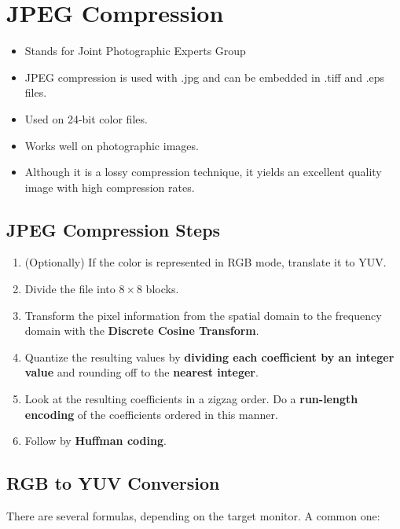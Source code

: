 \section*{JPEG Compression}

\begin{itemize}
  \item Stands for Joint Photographic Experts Group
  \item JPEG compression is used with .jpg and can be embedded in
    .tiff and .eps files.
  \item Used on 24-bit color files.
  \item Works well on photographic images.
  \item Although it is a lossy compression technique, it yields an
    excellent quality image with high compression rates.
\end{itemize}

\subsection*{JPEG Compression Steps}

\begin{enumerate}

  \item (Optionally) If the color is represented in RGB mode,
    translate it to YUV.
  \item Divide the file into $8 \times 8$ blocks.
  \item Transform the pixel information from the spatial domain to
    the frequency domain with the \textbf{Discrete Cosine Transform}.
  \item Quantize the resulting values by \textbf{dividing each coefficient
    by an integer value} and rounding off to the \textbf{nearest integer}.
  \item Look at the resulting coefficients in a zigzag order. Do a
    \textbf{run-length encoding} of the coefficients ordered in this manner.
  \item Follow by \textbf{Huffman coding}.

\end{enumerate}

\subsection*{RGB to YUV Conversion}

There are several formulas, depending on the target monitor. A common one:

